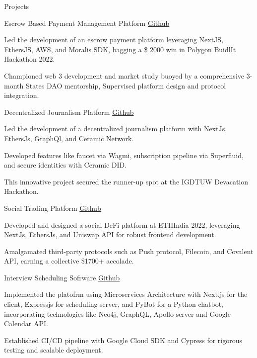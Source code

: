 \documentclass[10pt]{resume}
\begin{document}
    \begin{rSection}{Projects}
            \begin{rSubsection}{Escrow Based Payment Management Platform}                   {\href{https://github.com/RevereLabs}{Github}}
                \item Led the development of an escrow payment platform leveraging NextJS, EthersJS, AWS, and Moralis SDK, bagging a \$ 2000 win in Polygon BuidlIt Hackathon 2022. 
                \item Championed web 3 development and market study buoyed by a comprehensive 3-month States DAO mentorship, Supervised platform design and protocol integration.
    	\end{rSubsection}

         
         \begin{rSubsection}{Decentralized Journalism Platform}
            {\href{https://github.com/0xFethr}{Github}}
                \item Led the development of a decentralized journalism platform with NextJs, EthersJs, GraphQl, and Ceramic Network. 
                \item Developed features like faucet via Wagmi, subscription pipeline via Superfluid, and secure identities with Ceramic DID. 
                \item This innovative project secured the runner-up spot at the IGDTUW Devacation Hackathon.
        \end{rSubsection}
    
    
            \begin{rSubsection}{Social Trading Platform}
            {\href{https://github.com/AlkyneFi}{Github}}
                \item Developed and designed a social DeFi platform at ETHIndia 2022, leveraging NextJs, EthersJs, and Uniswap API for robust frontend development. 
                \item Amalgamated third-party protocols such as Push protocol, Filecoin, and Covalent API, earning a collective \$1700+ accolade.
    	\end{rSubsection}
    
    
    	\begin{rSubsection}{Interview Scheduling Sofrware}
            {\href{https://github.com/InterviewLink}{Github}}
                \item Implemented the platofrm using Microservices Architecture with Next.js for the client, Expressjs for scheduling server, and PyBot for a Python chatbot,  incorporating technologies like Neo4j, GraphQL, Apollo server and Google Calendar API. 
                \item Established CI/CD pipeline with Google Cloud SDK and Cypress for rigorous testing and scalable deployment.
    	\end{rSubsection}
    
    \end{rSection}
\end{document}
